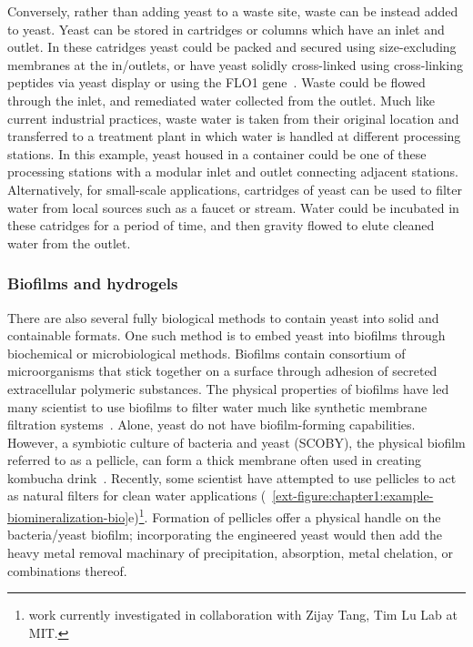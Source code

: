 \documentclass[../main/main]{subfiles}
\begin{document}
Conversely, rather than adding yeast to a waste site, waste can be instead added to yeast. Yeast can be stored in cartridges or columns which have an inlet and outlet. In these catridges yeast could be packed and secured using size-excluding membranes at the in/outlets, or have yeast solidly cross-linked using cross-linking peptides via yeast display or using the FLO1 gene~\cite{verstrepen2006}. Waste could be flowed through the inlet, and remediated water collected from the outlet. Much like current industrial practices, waste water is taken from their original location and transferred to a treatment plant in which water is handled at different processing stations. In this example, yeast housed in a container could be one of these processing stations with a modular inlet and outlet connecting adjacent stations. Alternatively, for small-scale applications, cartridges of yeast can be used to filter water from local sources such as a faucet or stream. Water could be incubated in these catridges for a period of time, and then gravity flowed to elute cleaned water from the outlet.

\subsubsection*{Biofilms and hydrogels}
There are also several fully biological methods to contain yeast into solid and containable formats. One such method is to embed yeast into biofilms through biochemical or microbiological methods. Biofilms contain consortium of microorganisms that stick together on a surface through adhesion of secreted extracellular polymeric substances. The physical properties of biofilms have led many scientist to use biofilms to filter water much like synthetic membrane filtration systems~\cite{simpson2008,shannon2010science}. Alone, yeast do not have biofilm-forming capabilities. However, a symbiotic culture of bacteria and yeast (SCOBY), the physical biofilm referred to as a pellicle, can form a thick membrane often used in creating kombucha drink~\cite{jayabalan2014review}. Recently, some scientist have attempted to use pellicles to act as natural filters for clean water applications
(\FIGURE~\ref{ext-figure:chapter1:example-biomineralization-bio}e)\footnote{
	work currently investigated in collaboration with Zijay Tang, Tim Lu Lab at MIT.
}. Formation of pellicles offer a physical handle on the bacteria/yeast biofilm; incorporating the engineered yeast would then add the heavy metal removal machinary of precipitation, absorption, metal chelation, or combinations thereof.
\end{document}
